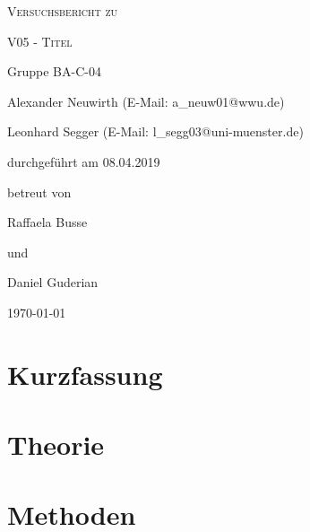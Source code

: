 \documentclass[
	a4paper,
	12pt,
	pagesize,
	ngerman
]{scrartcl}
\begin{document}
	\begin{titlepage}
		\centering
		{\scshape\LARGE Versuchsbericht zu \par}
		\vspace{1cm}
		{\scshape\huge V05 - Titel \par} %
		\vspace{2.5cm}
		{\LARGE Gruppe BA-C-04 \par}
		\vspace{0.5cm}

		{\large Alexander Neuwirth (E-Mail: a\_neuw01@wwu.de) \par}
		{\large Leonhard Segger (E-Mail: l\_segg03@uni-muenster.de) \par}
		\vfill

		durchgeführt am 08.04.2019\par
		betreut von\par
		{\large Raffaela Busse} \par
		und \par
		{\large Daniel Guderian}
		\vfill

		{\large \today\par}
	\end{titlepage}
	\tableofcontents
	\newpage


	\section{Kurzfassung}

  \section{Theorie}

	\section{Methoden}


\end{document}
